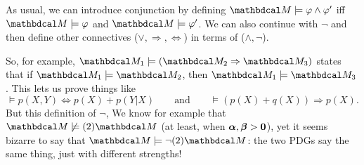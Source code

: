 %


As usual, we can introduce conjunction by
    defining $\dg M \models \varphi \land \varphi'$ iff
    $\dg M \models \varphi$ and $\dg M \models \varphi'$.
We can also continue with $\lnot$ and then define other connectives
    ($\lor, \Rightarrow, \Leftrightarrow$) in terms of ($\land, \lnot$).    

\TODO
    
So, for example, 
    $\dg M_1 \models (\dg M_2 \Rightarrow \dg M_3)$
    states that if $\dg M_1 \models \dg M_2$, then $\dg M_1 \models \dg M_3$. 
    This lets us prove things like
    \[
        \models p(X,Y) \Leftrightarrow p(X) + p(Y|X)
        \qquad
        \text{and}
        \qquad
        \models (p(X) + q(X)) \Rightarrow p(X).
    \]
But this definition of $\lnot$, 
We know for example that $ \dg M \not \models (2) \dg M$ (at least, when $\boldsymbol\alpha,\boldsymbol\beta > \mathbf 0$), 
yet it seems bizarre to say that $\dg M \models \lnot (2) \dg M$: the two PDGs say the same thing, just with different strengths! 

